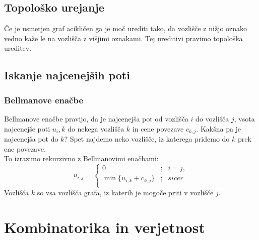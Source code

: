 \documentclass[10pt,a4paper,oneside]{book}
\begin{document}
\section{Topološko urejanje}
Če je usmerjen graf acikličen ga je moč urediti tako, da vozlišče z nižjo oznako vedno kaže le na vozlišča z višjimi oznakami. Tej ureditivi pravimo topološka ureditev. 


\section{Iskanje najcenejših poti}
\subsection{Bellmanove enačbe}
Bellmanove enačbe pravijo, da je najcenejša pot od vozlišča $i$ do vozlišča $j$, vsota najcenejše poti $u_i,k$ do nekega vozlišča $k$ in cene povezave $c_{k,j}$. Kakšna pa je najcenejša pot do $k$? Spet najdemo neko vozlišče, iz katerega pridemo do $k$ prek ene povezave.\\
To izrazimo rekurzivno z Bellmanovimi enačbami:
\[	u_{i,j} =
	\left\{
		\begin{array}{cll}
			0 &;& i = j,\\
			\min \{ u_{i,k} + c_{k,j} \} &;& sicer\\
		\end{array}
	\right. \]
Vozlišča $k$ so vsa vozlišča grafa, iz katerih je mogoče priti v vozlišče $j$.

\chapter{Kombinatorika in verjetnost}
\end{document}
